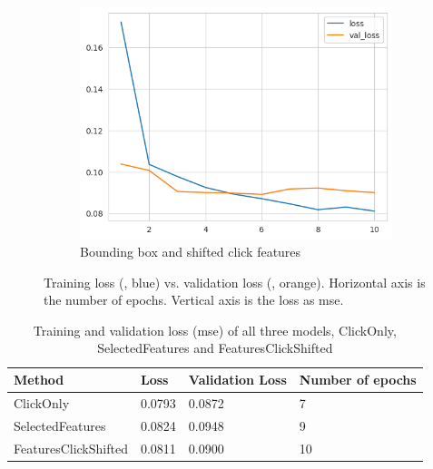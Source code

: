 \begin{figure}[htbp!]
\begin{subfigure}[b]{0.8\textwidth}
    \centering
    \includegraphics[width=\textwidth]{graphics/model_history_loss_features_shifted}
    \caption{Bounding box and shifted click features}
    \label{fig:model_history_loss_features_shifted}
  \end{subfigure}
  \caption[Training loss vs. validation loss]{Training loss (, blue) vs. validation loss (, orange). Horizontal axis is the number of epochs. Vertical axis is the loss as \gls{mse}.}
  \label{fig:model_history_losses}
\end{figure}

\begin{table}[htbp!]
  \small
  \centering
  \begin{tabular}{|l|l|l|l|}
    \hline
    \textbf{Method}      & \textbf{Loss} & \textbf{Validation Loss} & \textbf{Number of epochs} \\
    \hline
    ClickOnly            & 0.0793        & 0.0872                   & 7                         \\
    SelectedFeatures     & 0.0824        & 0.0948                   & 9                         \\
    FeaturesClickShifted & 0.0811        & 0.0900                   & 10                        \\
    \hline
  \end{tabular}
  \caption[Training and validation loss, number of epochs]{Training and validation loss (\gls{mse}) of all three models, ClickOnly, SelectedFeatures and FeaturesClickShifted}
  \label{tab:model_losses}
\end{table}

